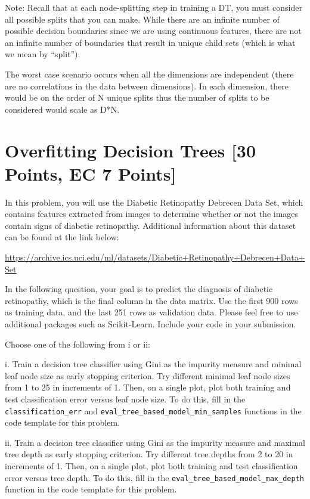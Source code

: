 Note: Recall that at each node-splitting step in training a DT, you must consider all possible splits that you can make. While there are an infinite number of possible decision boundaries since we are using continuous features, there are not an infinite number of boundaries that result in unique child sets (which is what we mean by ``split'').

\begin{solution}
   The worst case scenario occurs when all the dimensions are independent (there are no correlations in the data between dimensions). In each dimension, there would be on the order of N unique splits thus the number of splits to be considered would scale as D*N.
\end{solution}


\newpage


\section{Overfitting Decision Trees [30 Points, EC 7 Points]}

In this problem, you will use the Diabetic Retinopathy Debrecen Data Set, which contains features extracted from images to determine whether or not the images contain signs of diabetic retinopathy. Additional information about this dataset can be found at the link below:

\url{https://archive.ics.uci.edu/ml/datasets/Diabetic+Retinopathy+Debrecen+Data+Set}

In the following question, your goal is to predict the diagnosis of diabetic retinopathy, which is the final column in the data matrix.  Use the first 900 rows as training data, and the last
251 rows as validation data. Please feel free to use additional packages such as Scikit-Learn. Include your code in your submission.


\indent\problem[10] \smallskip 
Choose one of the following from i or ii: 

\noindent i. Train a decision tree classifier using Gini as the impurity measure and minimal leaf node size as early stopping criterion. Try different minimal leaf node sizes from 1 to 25 in increments of 1. Then, on a single plot, plot both training and test classification error versus leaf node size. To do this, fill in the \texttt{classification_err} and \texttt{eval_tree_based_model_min_samples} functions in the code template for this problem.


ii. Train a decision tree classifier using Gini as the impurity measure and maximal tree depth as early stopping criterion. Try different tree depths from 2 to 20 in increments of 1. Then, on a single plot, plot both training and test classification error versus tree depth. To do this, fill in the \texttt{eval_tree_based_model_max_depth} function in the code template for this problem.

